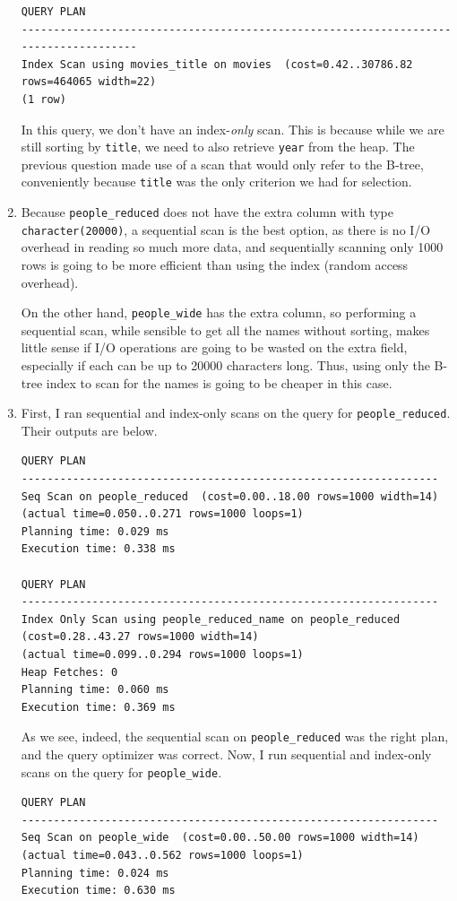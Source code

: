 \documentclass{article}
\begin{document}
\begin{enumerate}
\begin{Verbatim}
QUERY PLAN
-------------------------------------------------------------------------------------
Index Scan using movies_title on movies  (cost=0.42..30786.82 rows=464065 width=22)
(1 row)
\end{Verbatim}

In this query, we don't have an index-\emph{only} scan. This is because while we are still sorting by \verb|title|, we need to also retrieve \verb|year| from the heap. The previous question made use of a scan that would only refer to the B-tree, conveniently because \verb|title| was the only criterion we had for selection.

\item Because \verb|people_reduced| does not have the extra column with type \verb|character(20000)|, a sequential scan is the best option, as there is no I/O overhead in reading so much more data, and sequentially scanning only 1000 rows is going to be more efficient than using the index (random access overhead).

On the other hand, \verb|people_wide| has the extra column, so performing a sequential scan, while sensible to get all the names without sorting, makes little sense if I/O operations are going to be wasted on the extra field, especially if each can be up to 20000 characters long. Thus, using only the B-tree index to scan for the names is going to be cheaper in this case.

\item First, I ran sequential and index-only scans on the query for \verb|people_reduced|. Their outputs are below.
\begin{verbatim}
QUERY PLAN                                                   
-----------------------------------------------------------------
Seq Scan on people_reduced  (cost=0.00..18.00 rows=1000 width=14) 
(actual time=0.050..0.271 rows=1000 loops=1)
Planning time: 0.029 ms
Execution time: 0.338 ms

QUERY PLAN                                                                    
-----------------------------------------------------------------
Index Only Scan using people_reduced_name on people_reduced  (cost=0.28..43.27 rows=1000 width=14) 
(actual time=0.099..0.294 rows=1000 loops=1)
Heap Fetches: 0
Planning time: 0.060 ms
Execution time: 0.369 ms
\end{verbatim}
As we see, indeed, the sequential scan on \verb|people_reduced| was the right plan, and the query optimizer was correct. Now, I run sequential and index-only scans on the query for \verb|people_wide|.
\begin{verbatim}
QUERY PLAN                                                  
-----------------------------------------------------------------
Seq Scan on people_wide  (cost=0.00..50.00 rows=1000 width=14) 
(actual time=0.043..0.562 rows=1000 loops=1)
Planning time: 0.024 ms
Execution time: 0.630 ms


\end{verbatim}
\end{enumerate}
\end{document}
